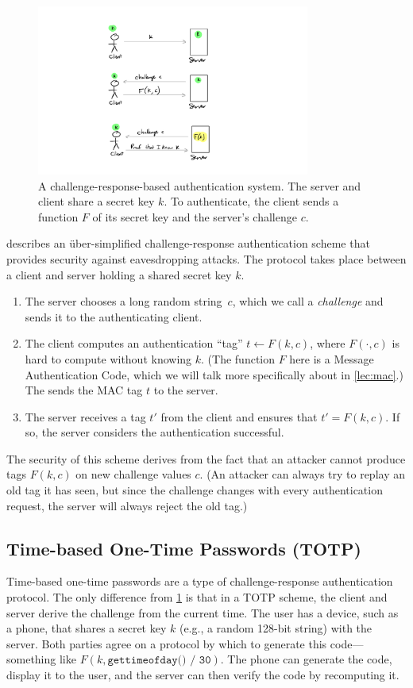 \begin{figure}
  \includegraphics[width=0.8\textwidth]{figs/auth-eavesdropping.pdf}
  \caption{A challenge-response-based authentication system. The
  server and client share a secret key $k$. To authenticate, the
  client sends a function $F$ of its secret key and the server's challenge $c$.}\label{fig:auth-eaves}
\end{figure}

 describes an \"uber-simplified challenge-response
authentication scheme that provides security against eavesdropping attacks.
The protocol takes place between a client and server holding a shared secret key $k$.
\begin{enumerate}
	\item The server chooses a long random string~$c$, which we call a \textit{challenge} 
        and sends it to the authenticating client.
  \item The client computes an authentication ``tag'' $t \gets F(k, c)$, where $F(\cdot, c)$ is hard to compute without knowing $k$.
        (The function $F$ here is a Message Authentication Code, 
        which we will talk more specifically about in \cref{lec:mac}.)
        The sends the MAC tag $t$ to the server.
  \item The server receives a tag $t'$ from the client and ensures that $t' = F(k,c)$.
        If so, the server considers the authentication successful.
\end{enumerate}
The security of this scheme derives from the fact that an attacker cannot
produce tags $F(k,c)$ on new challenge values $c$. (An attacker can always
try to replay an old tag it has seen, but since the challenge changes with
every authentication request, the server will always reject the old tag.)

\subsection{Time-based One-Time Passwords (TOTP)}
Time-based one-time passwords are a type of challenge-response authentication
protocol. The only difference from \cref{fig:auth-eaves} is that in a TOTP
scheme, the client and server derive the challenge from the current time.
The user has a device, such as 
a phone, that shares a secret key $k$ (e.g., a random 128-bit string) 
with the server.
Both parties agree on a protocol by which to
generate this code---something like $F(k, \texttt{gettimeofday() / 30})$.
The phone can generate the code, display it to the user, and the server
can then verify the code by recomputing it.


